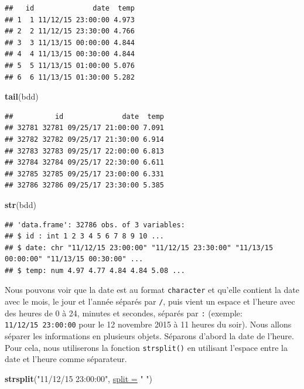 \documentclass[twoside,symmetric]{book}
\newenvironment{Shaded}{}{}
\newcommand{\DataTypeTok}[1]{\underline{#1}}
\newcommand{\KeywordTok}[1]{\textbf{#1}}
\newcommand{\NormalTok}[1]{#1}
\newcommand{\StringTok}[1]{#1}
\begin{document}
\begin{verbatim}
##   id              date  temp
## 1  1 11/12/15 23:00:00 4.973
## 2  2 11/12/15 23:30:00 4.766
## 3  3 11/13/15 00:00:00 4.844
## 4  4 11/13/15 00:30:00 4.844
## 5  5 11/13/15 01:00:00 5.076
## 6  6 11/13/15 01:30:00 5.282
\end{verbatim}

\begin{Shaded}
\begin{Highlighting}[]
\KeywordTok{tail}\NormalTok{(bdd)}
\end{Highlighting}
\end{Shaded}

\begin{verbatim}
##          id              date  temp
## 32781 32781 09/25/17 21:00:00 7.091
## 32782 32782 09/25/17 21:30:00 6.914
## 32783 32783 09/25/17 22:00:00 6.813
## 32784 32784 09/25/17 22:30:00 6.611
## 32785 32785 09/25/17 23:00:00 6.331
## 32786 32786 09/25/17 23:30:00 5.385
\end{verbatim}

\begin{Shaded}
\begin{Highlighting}[]
\KeywordTok{str}\NormalTok{(bdd)}
\end{Highlighting}
\end{Shaded}

\begin{verbatim}
## 'data.frame': 32786 obs. of 3 variables:
## $ id : int 1 2 3 4 5 6 7 8 9 10 ...
## $ date: chr "11/12/15 23:00:00" "11/12/15 23:30:00" "11/13/15
00:00:00" "11/13/15 00:30:00" ...
## $ temp: num 4.97 4.77 4.84 4.84 5.08 ...
\end{verbatim}

Nous pouvons voir que la date est au format \texttt{character} et qu'elle contient la date avec le mois, le jour et l'année séparés par \texttt{/}, puis vient un espace et l'heure avec des heures de 0 à 24, minutes et secondes, séparés par \texttt{:} (exemple: \texttt{11/12/15\ 23:00:00} pour le 12 novembre 2015 à 11 heures du soir). Nous allons séparer les informations en plusieurs objets. Séparons d'abord la date de l'heure. Pour cela, nous utiliserons la fonction \texttt{strsplit()} en utilisant l'espace entre la date et l'heure comme séparateur.

\begin{Shaded}
\begin{Highlighting}[]
\KeywordTok{strsplit}\NormalTok{(}\StringTok{"11/12/15 23:00:00"}\NormalTok{, }\DataTypeTok{split =} \StringTok{" "}\NormalTok{)}
\end{Highlighting}
\end{Shaded}
\end{document}
